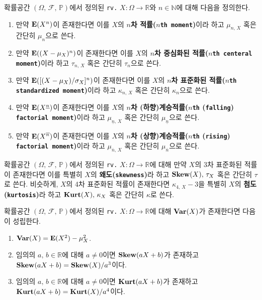 \begin{definition}
    확률공간 $(\Omega,\,\mathcal{F},\,\mathbb{P})$에서 정의된 \texttt{rv.} $X:\Omega\to\mathbb{R}$와 $n\in\mathbb{N}$에 대해 다음을 정의한다.
    \begin{enumerate}
        \item 만약 $\mathbf{E}(X^n)$이 존재한다면 이를 $X$의 \textbf{$n$차 적률($n$\texttt{th moment})}이라 하고 $\mu_{n,\,X}$ 혹은 간단히 $\mu_n$으로 쓴다.
        \item 만약 $\mathbf{E}((X-\mu_X)^n)$이 존재한다면 이를 $X$의 \textbf{$n$차 중심화된 적률($n$\texttt{th centeral moment})}이라 하고 $\tau_{n,\,X}$ 혹은 간단히 $\tau_n$으로 쓴다.
        \item 만약 $\mathbf{E}([(X-\mu_X)/\sigma_X]^n)$이 존재한다면 이를 $X$의 \textbf{$n$차 표준화된 적률($n$\texttt{th standardized moment})}이라 하고 $\kappa_{n,\,X}$ 혹은 간단히 $\kappa_n$으로 쓴다.
        \item 만약 $\mathbf{E}(X^{\underline{n}})$이 존재한다면 이를 $X$의 \textbf{$n$차 (하향)계승적률($n$\texttt{th} (\texttt{falling}) \texttt{factorial moment})}이라 하고 $\mu_{\underline{n},\,X}$ 혹은 간단히 $\mu_{\underline{n}}$으로 쓴다.
        \item 만약 $\mathbf{E}(X^{\overline{n}})$이 존재한다면 이를 $X$의 \textbf{$n$차 (상향)계승적률($n$\texttt{th} (\texttt{rising}) \texttt{factorial moment})}이라 하고 $\mu_{\overline{n},\,X}$ 혹은 간단히 $\mu_{\overline{n}}$으로 쓴다.
    \end{enumerate}
\end{definition}

\begin{definition}
    확률공간 $(\Omega,\,\mathcal{F},\,\mathbb{P})$에서 정의된 \texttt{rv.} $X:\Omega\to\mathbb{R}$에 대해 만약 $X$의 3차 표준화된 적률이 존재한다면 이를 특별히 $X$의 \textbf{왜도(\texttt{skewness})}라 하고 $\mathbf{Skew}(X),\,\tau_X$ 혹은 간단히 $\tau$로 쓴다. 비슷하게, $X$의 4차 표준화된 적률이 존재한다면 $\kappa_{4,\,X}-3$을 특별히 $X$의 \textbf{첨도(\texttt{kurtosis})}라 하고 $\mathbf{Kurt}(X),\,\kappa_X$ 혹은 간단히 $\kappa$로 쓴다.
\end{definition}

\begin{theorem}
    확률공간 $(\Omega,\,\mathcal{F},\,\mathbb{P})$에서 정의된 \texttt{rv.} $X:\Omega\to\mathbb{R}$에 대해 $\mathbf{Var}(X)$가 존재한다면 다음이 성립한다.
    \begin{enumerate}
        \item $\mathbf{Var}(X)=\mathbf{E}(X^2)-\mu_X^2$.
        \item 임의의 $a,\,b\in\mathbb{R}$에 대해 $a\ne0$이면 $\mathbf{Skew}(aX+b)$가 존재하고 $\mathbf{Skew}(aX+b)=\mathbf{Skew}(X)/a^3$이다.
        \item 임의의 $a,\,b\in\mathbb{R}$에 대해 $a\ne0$이면 $\mathbf{Kurt}(aX+b)$가 존재하고 $\mathbf{Kurt}(aX+b)=\mathbf{Kurt}(X)/a^4$이다.
    \end{enumerate}
\end{theorem}

